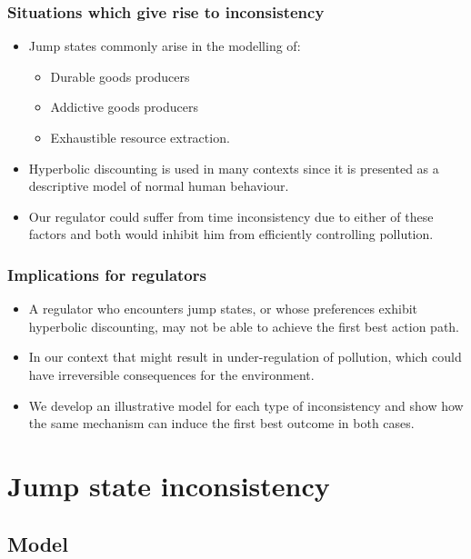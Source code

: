 \documentclass{beamer}
\begin{document}
\begin{frame}
  \frametitle{Situations which give rise to inconsistency}
\begin{itemize}
\item<1-> Jump states commonly arise in the modelling of:
  \begin{itemize}
  \item<1-> Durable goods producers
  \item<2-> Addictive goods producers
  \item<3-> Exhaustible resource extraction.
  \end{itemize}
\item<4-> Hyperbolic discounting is used in many contexts since it is
  presented as a descriptive model of normal human behaviour.
\item<5-> Our regulator could suffer from time inconsistency due to
  either of these factors and both would inhibit him from efficiently
  controlling pollution.
\end{itemize}
\end{frame}

\begin{frame}
  \frametitle{Implications for regulators}
  \begin{itemize}
  \item<1-> A regulator who encounters jump states, or whose
    preferences exhibit hyperbolic discounting, may not be able to
    achieve the first best action path.
  \item<2-> In our context that might result in under-regulation of
    pollution, which could have irreversible consequences for the
    environment.
  \item<3-> We develop an illustrative model for each type of
    inconsistency and show how the same mechanism can induce the first
    best outcome in both cases.
  \end{itemize}
\end{frame}

\section{Jump state inconsistency}

\subsection{Model}
\end{document}
